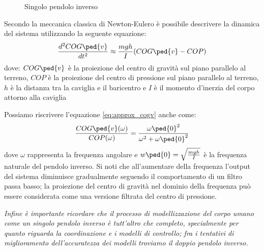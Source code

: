 \begin{figure}[!htb]
    \caption{\label{fig:inverted_pendulum} Singolo pendolo inverso}
\end{figure}

Secondo la meccanica classica di Newton-Eulero è possibile descrivere la dinamica del sistema utilizzando la seguente equazione:
\begin{equation}
    {d^2COG\ped{v} \over dt^2} \approx {mgh \over I}(COG\ped{v}-COP)
    \label{eq:approx_cogv}
\end{equation}
dove: $COG\ped{v}$ è la proiezione del centro di gravità sul piano parallelo al terreno, $COP$ è la proiezione del centro di pressione sul piano parallelo al terreno, $h$ è la distanza tra la caviglia e il baricentro e $I$ è il momento d'inerzia del corpo attorno alla caviglia

Possiamo riscrivere l'equazione \ref{eq:approx_cogv} anche come:
\begin{equation}
    {COG\ped{v}(\omega) \over COP(\omega)} = {\omega\ped{0}^2 \over \omega^2+\omega\ped{0}^2}
    \label{eq:cogv_polar}
\end{equation}
dove $\omega$ rappresenta la frequenza angolare e $w\ped{0} = \sqrt{mgh \over I}$ è la frequenza naturale del pendolo inverso. Si noti che all'aumentare della frequenza l'output del sistema diminuisce gradualmente seguendo il comportamento di un filtro passa basso; la proiezione del centro di gravità nel dominio della frequenza può essere considerata come una versione filtrata del centro di pressione.

{\itshape Infine è importante ricordare che il processo di modellizzazione del corpo umano come un singolo pendolo inverso è tutt'altro che completo, specialmente per quanto riguarda la coordinazione e i modelli di controllo; fra i tentativi di miglioramento dell'accuratezza dei modelli troviamo il doppio pendolo inverso.}

